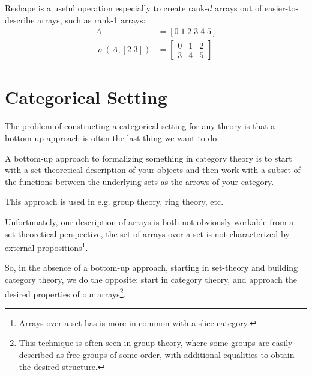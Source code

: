\documentclass{DIKU-report-variant}
\begin{document}
\begin{example}
  \label{ex:reshape}
  Reshape is a useful operation especially to create rank-\(d\) arrays
  out of easier-to-describe arrays, such as rank-1 arrays:
  \begin{align*}
    A &= [0\; 1\; 2\; 3\; 4\; 5] \\
    \varrho(A, [2\;3]) &= \begin{bmatrix}
      0 & 1 & 2 \\
      3 & 4 & 5 
    \end{bmatrix}
  \end{align*}
\end{example}

\section{Categorical Setting}

The problem of constructing a categorical setting for any theory
is that a bottom-up approach is often the last thing we want to do.

A bottom-up approach to formalizing something in category theory is to
start with a set-theoretical description of your objects
and then work with a subset of the functions between the underlying sets as
the arrows of your category.

This approach is used in e.g. group theory, ring theory, etc.

Unfortunately, our description of arrays is both not obviously workable from a
set-theoretical perspective, the set of arrays over a set is not characterized by
external propositions\footnote{Arrays over a set has is more in common with a slice category.}.

So, in the absence of a bottom-up approach, starting in set-theory and building category theory,
we do the opposite: start in category theory, and approach the desired properties of our arrays\footnote{This technique is often seen in group theory, where some groups are easily described as
free groups of some order, with additional equalities to obtain the desired structure.}.
\end{document}
